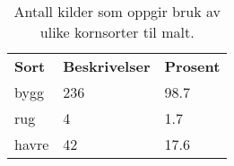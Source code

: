 \begin{table}
\begin{center}
\begin{tabular}{|l|l|l|}
\hline
\textbf{Sort} & \textbf{Beskrivelser} & \textbf{Prosent}\\
bygg & 236 & 98.7\\
rug & 4 & 1.7\\
havre & 42 & 17.6\\
\hline
\end{tabular}
\caption{
Antall kilder som oppgir bruk av ulike kornsorter til malt.
}\label{tbl-grain-table-country}
\end{center}
\end{table}
